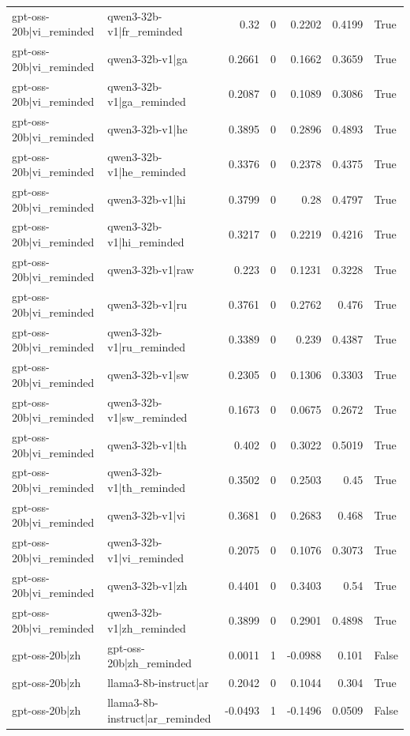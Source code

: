 \begin{table}
\begin{tabular}{l l r r r r l}
gpt-oss-20b|vi_reminded & qwen3-32b-v1|fr_reminded & 0.32 & 0 & 0.2202 & 0.4199 & True \\
gpt-oss-20b|vi_reminded & qwen3-32b-v1|ga & 0.2661 & 0 & 0.1662 & 0.3659 & True \\
gpt-oss-20b|vi_reminded & qwen3-32b-v1|ga_reminded & 0.2087 & 0 & 0.1089 & 0.3086 & True \\
gpt-oss-20b|vi_reminded & qwen3-32b-v1|he & 0.3895 & 0 & 0.2896 & 0.4893 & True \\
gpt-oss-20b|vi_reminded & qwen3-32b-v1|he_reminded & 0.3376 & 0 & 0.2378 & 0.4375 & True \\
gpt-oss-20b|vi_reminded & qwen3-32b-v1|hi & 0.3799 & 0 & 0.28 & 0.4797 & True \\
gpt-oss-20b|vi_reminded & qwen3-32b-v1|hi_reminded & 0.3217 & 0 & 0.2219 & 0.4216 & True \\
gpt-oss-20b|vi_reminded & qwen3-32b-v1|raw & 0.223 & 0 & 0.1231 & 0.3228 & True \\
gpt-oss-20b|vi_reminded & qwen3-32b-v1|ru & 0.3761 & 0 & 0.2762 & 0.476 & True \\
gpt-oss-20b|vi_reminded & qwen3-32b-v1|ru_reminded & 0.3389 & 0 & 0.239 & 0.4387 & True \\
gpt-oss-20b|vi_reminded & qwen3-32b-v1|sw & 0.2305 & 0 & 0.1306 & 0.3303 & True \\
gpt-oss-20b|vi_reminded & qwen3-32b-v1|sw_reminded & 0.1673 & 0 & 0.0675 & 0.2672 & True \\
gpt-oss-20b|vi_reminded & qwen3-32b-v1|th & 0.402 & 0 & 0.3022 & 0.5019 & True \\
gpt-oss-20b|vi_reminded & qwen3-32b-v1|th_reminded & 0.3502 & 0 & 0.2503 & 0.45 & True \\
gpt-oss-20b|vi_reminded & qwen3-32b-v1|vi & 0.3681 & 0 & 0.2683 & 0.468 & True \\
gpt-oss-20b|vi_reminded & qwen3-32b-v1|vi_reminded & 0.2075 & 0 & 0.1076 & 0.3073 & True \\
gpt-oss-20b|vi_reminded & qwen3-32b-v1|zh & 0.4401 & 0 & 0.3403 & 0.54 & True \\
gpt-oss-20b|vi_reminded & qwen3-32b-v1|zh_reminded & 0.3899 & 0 & 0.2901 & 0.4898 & True \\
gpt-oss-20b|zh & gpt-oss-20b|zh_reminded & 0.0011 & 1 & -0.0988 & 0.101 & False \\
gpt-oss-20b|zh & llama3-8b-instruct|ar & 0.2042 & 0 & 0.1044 & 0.304 & True \\
gpt-oss-20b|zh & llama3-8b-instruct|ar_reminded & -0.0493 & 1 & -0.1496 & 0.0509 & False \\

\end{tabular}
\end{table}
